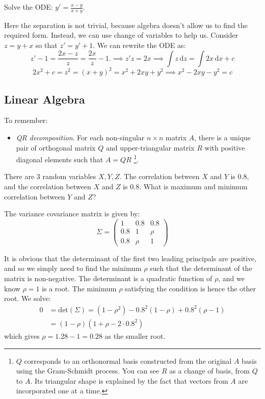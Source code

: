 \begin{qanda} %
    \Q
    Solve the ODE: $y'= \frac{x-y}{x+y}$.

    \A
    Here the separation is not trivial, because algebra doesn't allow us to find the required form. Instead, we can use change of variables to help us.
    Consider $z=y + x$ so that $z' = y' + 1$. We can rewrite the ODE as:
    \[
    z' - 1 = \frac{2x-z}{z} = \frac{2x}{z} - 1. 
    \implies 
    z'z = 2x
    \implies
    \int  z \, \mathrm{d}z= \int 2x \, \mathrm{d}x  + c
    \]
    \[
     2x^2 + c = z^2 = (x + y)^2 = x^2 + 2xy + y^2 
    \implies 
    x^2 - 2xy - y^2 = c
    \]
\end{qanda}


\subsection{Linear Algebra}

To remember:
\begin{itemize}
    \item \emph{QR decomposition}. For each non-singular $n \times n$ matrix $A$, there is a unique pair of orthogonal matrix $Q$ and upper-triangular matrix $R$ with positive diagonal elements such that $A = QR$
        \footnote{$Q$ corresponds to an orthonormal basis constructed from the original $A$ basis using the Gram-Schmidt process. You can see $R$ as a change of basis, from $Q$ to $A$. Its triangular shape is explained by the fact that vectors from $A$ are incorporated one at a time.}.
\end{itemize}

\begin{qanda}
  \Q 
  There are 3 random variables $X, Y, Z$.
  The correlation between $X$ and $Y$ is 0.8, and 
  the correlation between $X$ and $Z$ is 0.8. 
  What is maximum and minimum correlation between $Y$ and $Z$?

  \A
  The variance covariance matrix is given by:
  \[
      \Sigma = \begin{pmatrix}
    1 & 0.8 & 0.8  \\
    0.8 & 1  & \rho \\
    0.8 & \rho & 1 
  \end{pmatrix}
  \]

  It is obvious that the determinant of the first two leading principals are positive, and so we simply need to find the minimum $\rho$ such that the determinant of the matrix is non-negative.
  The determinant is a quadratic function of $\rho$, and we know $\rho = 1$ is a root. The minimum $\rho$ satisfying the condition is hence the other root. We solve:
  \begin{align*}
      0 &= \text{det}(\Sigma) = (1 - \rho^2) - 0.8^2 (1-\rho) + 0.8^2 (\rho-1) \\
        &= (1-\rho) (1 + \rho - 2 \cdot 0.8^2)
  \end{align*}
  which gives $\rho = 1.28 - 1 = 0.28$ as the smaller root.
\end{qanda}

